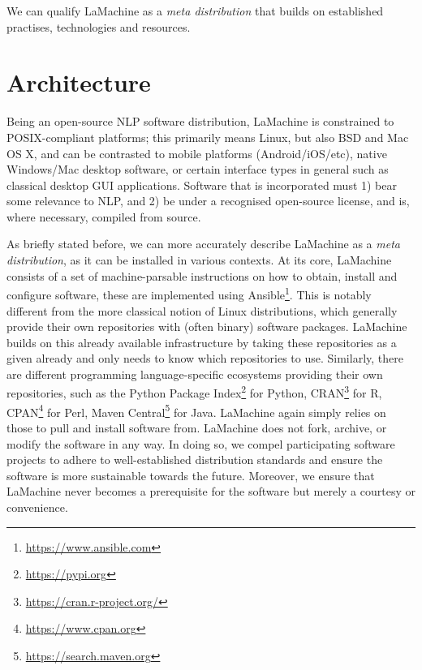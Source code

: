 \documentclass[a4paper,11pt]{article}
\begin{document}
We can qualify LaMachine as a \emph{meta distribution} that builds on established practises, technologies and resources.

\section{Architecture}

Being an open-source NLP software distribution, LaMachine is constrained to POSIX-compliant platforms; this primarily
means Linux, but also BSD and Mac OS X, and can be contrasted to mobile platforms (Android/iOS/etc), native Windows/Mac
desktop software, or certain interface types in general such as classical desktop GUI applications. Software that is
incorporated must 1) bear some relevance to NLP, and 2) be under a recognised open-source license, and is, where
necessary, compiled from source.

As briefly stated before, we can more accurately describe LaMachine as a \emph{meta distribution}, as it can be
installed in various contexts. At its core, LaMachine consists of a set of machine-parsable instructions on how to
obtain, install and configure software, these are implemented using Ansible\footnote{\url{https://www.ansible.com}}.
This is notably different from the more classical notion of Linux distributions, which generally provide their own
repositories with (often binary) software packages. LaMachine builds on this already available infrastructure by taking
these repositories as a given already and only needs to know which repositories to use.  Similarly, there are different
programming language-specific ecosystems providing their own repositories, such as the Python Package
Index\footnote{\url{https://pypi.org}} for Python, CRAN\footnote{\url{https://cran.r-project.org/}} for R,
CPAN\footnote{\url{https://www.cpan.org}} for Perl, Maven Central\footnote{\url{https://search.maven.org}} for Java.
LaMachine again simply relies on those to pull and install software from. LaMachine does not fork, archive, or modify the software
in any way. In doing so, we compel participating software projects to adhere to well-established distribution standards
and ensure the software is more sustainable towards the future. Moreover, we ensure that LaMachine never becomes a
prerequisite for the software but merely a courtesy or convenience.
\end{document}
